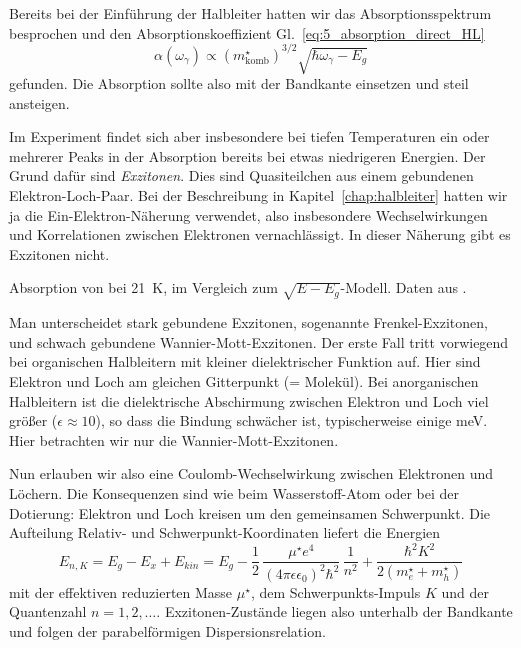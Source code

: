 Bereits bei der Einführung der Halbleiter hatten wir das Absorptionsspektrum besprochen und den Absorptionskoeffizient Gl.~\ref{eq:5_absorption_direct_HL}
\begin{equation}
    \alpha(\omega_\gamma) \propto ( m^\star_\text{komb})^{3/2}  \sqrt{\hbar \omega_\gamma - E_g}
\end{equation}
gefunden. Die Absorption sollte also mit der Bandkante einsetzen und steil ansteigen.



Im Experiment findet sich aber insbesondere bei tiefen Temperaturen ein oder mehrerer Peaks in der Absorption bereits bei etwas niedrigeren Energien. Der Grund dafür sind \emph{Exzitonen}. Dies sind Quasiteilchen aus einem gebundenen Elektron-Loch-Paar. Bei der Beschreibung in Kapitel~\ref{chap:halbleiter}
hatten wir ja die Ein-Elektron-Näherung verwendet, also insbesondere Wechselwirkungen und Korrelationen zwischen Elektronen vernachlässigt. In dieser Näherung gibt es Exzitonen nicht.

\begin{marginfigure}
    \caption{Absorption von  bei 21~K, im Vergleich zum $\sqrt{E-E_g}$-Modell. Daten aus \cite{Sturge1962}.}
\end{marginfigure}

Man unterscheidet stark gebundene Exzitonen, sogenannte Frenkel-Exzitonen, und schwach gebundene Wannier-Mott-Exzitonen. Der erste Fall tritt vorwiegend bei organischen Halbleitern mit kleiner dielektrischer Funktion auf. Hier sind Elektron und Loch am gleichen Gitterpunkt (= Molekül). Bei anorganischen Halbleitern ist die dielektrische Abschirmung zwischen Elektron und Loch viel größer ($\epsilon \approx 10 $), so dass die Bindung schwächer ist, typischerweise einige meV. Hier betrachten wir nur die Wannier-Mott-Exzitonen.


Nun erlauben wir also eine Coulomb-Wechselwirkung zwischen Elektronen und Löchern. Die Konsequenzen sind wie beim Wasserstoff-Atom oder bei der Dotierung: Elektron und Loch kreisen um den gemeinsamen Schwerpunkt. Die Aufteilung Relativ- und Schwerpunkt-Koordinaten liefert die Energien
\begin{equation}
    E_{n,K} = E_g - E_x + E_{kin} =   E_g - \frac{1}{2} \, \frac{\mu^\star e^4}{(4 \pi \epsilon \epsilon_0)^2 \hbar^2} \, \frac{1}{n^2}
    + \frac{\hbar^2 K^2}{2 (m_e^\star + m_h^\star)}
\end{equation}
mit der effektiven reduzierten Masse $\mu^\star$, dem Schwerpunkts-Impuls $K$ und der Quantenzahl $n=1, 2, \dots$. Exzitonen-Zustände liegen also unterhalb der Bandkante und folgen der parabelförmigen Dispersionsrelation.

